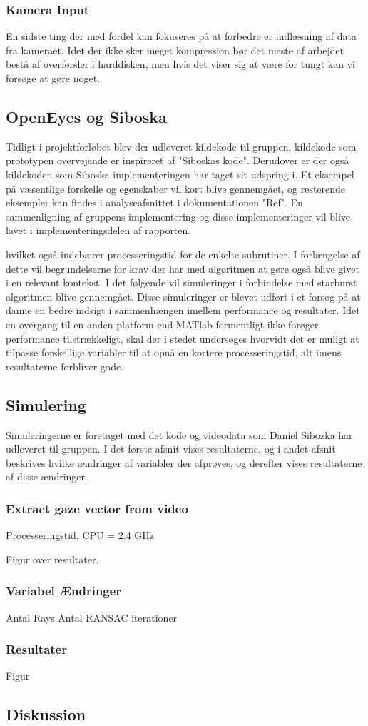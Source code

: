 \documentclass[rapport.tex]{subfiles}
\begin{document}
	\subsubsection{Kamera Input}
	En sidste ting der med fordel kan fokuseres på at forbedre er indlæsning af data fra kameraet. Idet der ikke sker meget kompression bør det meste af arbejdet bestå af overførsler i harddisken, men hvis det viser sig at være for tungt kan vi forsøge at gøre noget.
	\subsection{OpenEyes og Siboska}
	Tidligt i projektforløbet blev der udleveret kildekode til gruppen, kildekode som prototypen overvejende er inspireret af "Siboskas kode". Derudover er der også kildekoden som Siboska implementeringen har taget sit udspring i. Et eksempel på væsentlige forskelle og egenskaber vil kort blive gennemgået, og resterende eksempler kan findes i analyseafsnittet i dokumentationen "Ref". En sammenligning af gruppens implementering og disse implementeringer vil blive lavet i implementeringsdelen af rapporten.
	
	 hvilket også indebærer processeringstid for de enkelte subrutiner. I forlængelse af dette vil begrundelserne for krav der har med algoritmen at gøre også blive givet i en relevant kontekst.
	I det følgende vil simuleringer i forbindelse med starburst algoritmen blive gennemgået. Disse simuleringer er blevet udført i et forsøg på at danne en bedre indsigt i sammenhængen imellem performance og resultater. Idet en overgang til en anden platform end MATlab formentligt ikke forøger performance tilstrækkeligt, skal der i stedet undersøges hvorvidt det er muligt at tilpasse forskellige variabler til at opnå en kortere processeringstid, alt imens resultaterne forbliver gode.
	
	\subsection{Simulering}
	
	Simuleringerne er foretaget med det kode og videodata som Daniel Sibozka har udleveret til gruppen. I det første afsnit vises resultaterne, og i andet afsnit beskrives hvilke ændringer af variabler der afprøves, og derefter vises resultaterne af disse ændringer.
	
	\subsubsection{Extract gaze vector from video}
	
	Processeringstid, CPU = 2.4 GHz
	
	Figur over resultater.
	
	\subsubsection{Variabel Ændringer}
	
	Antal Rays
	Antal RANSAC iterationer
	
	
	\subsubsection{Resultater}
	
	Figur 
	\subsection{Diskussion}
		
\end{document}
